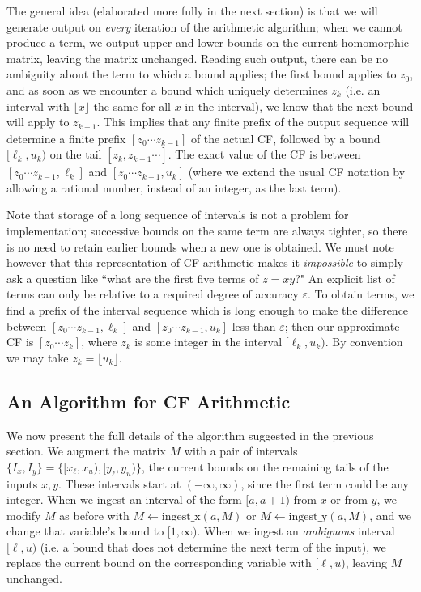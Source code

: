 \documentclass[11pt, oneside]{amsart}   	%
\begin{document}
The general idea (elaborated more fully in the next section) is that we will generate output on \emph{every} iteration of the arithmetic algorithm; when we cannot produce a term, we output upper and lower bounds on the current homomorphic matrix, leaving the matrix unchanged. Reading such output, there can be no ambiguity about the term to which a bound applies; the first bound applies to $z_0$, and as soon as we encounter a bound which uniquely determines $z_k$ (i.e. an interval with $\lfloor x \rfloor$ the same for all $x$ in the interval), we know that the next bound will apply to $z_{k+1}$. This implies that any finite prefix of the output sequence will determine a finite prefix $[z_0 \cdots z_{k-1}]$ of the actual CF, followed by a bound $[\ell_k,u_k)$ on the tail $[z_k, z_{k+1}\cdots]$. The exact value of the CF is between $[z_0 \cdots z_{k-1}, \ell_k]$ and $[z_0 \cdots z_{k-1}, u_k]$ (where we extend the usual CF notation by allowing a rational number, instead of an integer, as the last term).

Note that storage of a long sequence of intervals is not a problem for implementation; successive bounds on the same term are always tighter, so there is no need to retain earlier bounds when a new one is obtained. We must note however that this representation of CF arithmetic makes it \emph{impossible} to simply ask a question like ``what are the first five terms of $z = xy$?" An explicit list of terms can only be relative to a required degree of accuracy $\varepsilon$. To obtain terms, we find a prefix of the interval sequence which is long enough to make the difference between $[z_0 \cdots z_{k-1}, \ell_k]$ and $[z_0 \cdots z_{k-1}, u_k]$ less than $\varepsilon$; then our approximate CF is $[z_0 \cdots z_k]$, where $z_k$ is some integer in the interval $[\ell_k,u_k)$. By convention we may take $z_k = \lfloor u_k \rfloor$. 


\subsection{An Algorithm for CF Arithmetic}
We now present the full details of the algorithm suggested in the previous section.  We augment the matrix $M$ with a pair of intervals $\{I_x, I_y\} = \{[x_{\ell},x_{u}), [y_{\ell}, y_{u})\}$, the current bounds on the remaining tails of the inputs $x,y$. These intervals start at $(-\infty, \infty)$, since the first term could be any integer. When we ingest an interval of the form $[a,a+1)$ from $x$ or from $y$, we modify $M$ as before with $M \leftarrow \mbox{ingest\_x}(a,M)$ or $M \leftarrow \mbox{ingest\_y}(a,M)$, and we change that variable's bound to $[1, \infty)$. When we ingest an \emph{ambiguous} interval $[\ell, u)$ (i.e. a bound that does not determine the next term of the input), we replace the current bound on the corresponding variable with $[\ell, u)$, leaving $M$ unchanged. 
\end{document}
